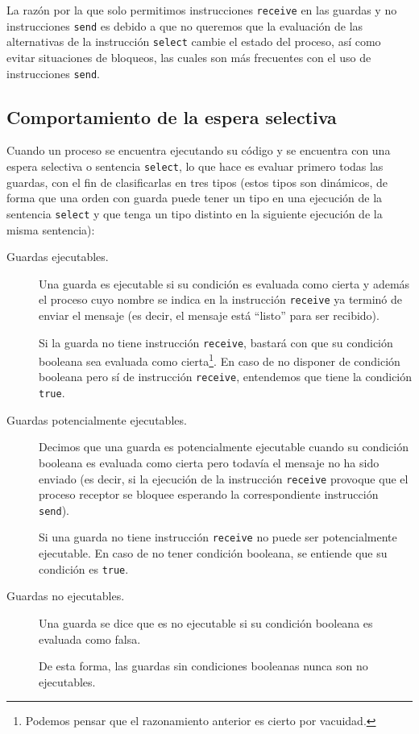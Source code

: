 La razón por la que solo permitimos instrucciones \verb|receive| en las guardas y no instrucciones \verb|send| es debido a que no queremos que la evaluación de las alternativas de la instrucción \verb|select| cambie el estado del proceso, así como evitar situaciones de bloqueos, las cuales son más frecuentes con el uso de instrucciones \verb|send|.

\subsection{Comportamiento de la espera selectiva}
Cuando un proceso se encuentra ejecutando su código y se encuentra con una espera selectiva o sentencia \verb|select|, lo que hace es evaluar primero todas las guardas, con el fin de clasificarlas en tres tipos (estos tipos son dinámicos, de forma que una orden con guarda puede tener un tipo en una ejecución de la sentencia \verb|select| y que tenga un tipo distinto en la siguiente ejecución de la misma sentencia):
\begin{description}
    \item [Guardas ejecutables.] Una guarda es ejecutable si su condición es evaluada como cierta y además el proceso cuyo nombre se indica en la instrucción \verb|receive| ya terminó de enviar el mensaje (es decir, el mensaje está ``listo'' para ser recibido).

        Si la guarda no tiene instrucción \verb|receive|, bastará con que su condición booleana sea evaluada como cierta\footnote{Podemos pensar que el razonamiento anterior es cierto por vacuidad.}. En caso de no disponer de condición booleana pero sí de instrucción \verb|receive|, entendemos que tiene la condición \verb|true|.
    \item [Guardas potencialmente ejecutables.] Decimos que una guarda es potencialmente ejecutable cuando su condición booleana es evaluada como cierta pero todavía el mensaje no ha sido enviado (es decir, si la ejecución de la instrucción \verb|receive| provoque que el proceso receptor se bloquee esperando la correspondiente instrucción \verb|send|).

        Si una guarda no tiene instrucción \verb|receive| no puede ser potencialmente ejecutable. En caso de no tener condición booleana, se entiende que su condición es \verb|true|.
    \item [Guardas no ejecutables.] Una guarda se dice que es no ejecutable si su condición booleana es evaluada como falsa.

        De esta forma, las guardas sin condiciones booleanas nunca son no ejecutables.
\end{description}
